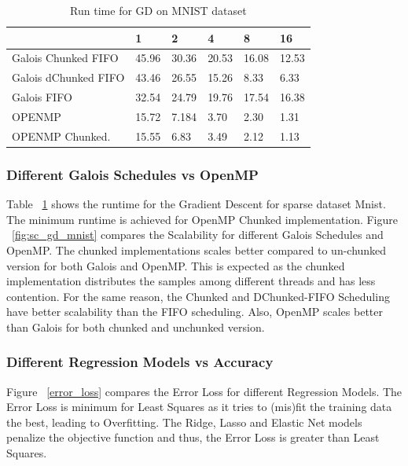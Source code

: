 \documentclass{sigplanconf}
\begin{document}
{\begin{table}[htbp]
\caption{Run time for GD on MNIST dataset}
\begin{tabular}{|p{9em}|p{2em}|p{2em}|p{2em}|p{2em}|p{2em}|}
\hline
 & 1 & 2 & 4 & 8 & 16 \\ \hline
Galois Chunked FIFO & 45.96 & 30.36 & 20.53 & 16.08 & 12.53 \\ \hline
Galois dChunked FIFO & 43.46 & 26.55 & 15.26 & 8.33 & 6.33 \\ \hline
Galois FIFO & 32.54 & 24.79 & 19.76 & 17.54 & 16.38 \\ \hline
OPENMP & 15.72 & 7.184 & 3.70 & 2.30 & 1.31 \\ \hline
OPENMP Chunked. & 15.55 & 6.83 & 3.49 & 2.12 & 1.13 \\ \hline
\end{tabular}
\label{tb:gd_mnist}
\end{table}
	
	\subsubsection{Different Galois Schedules vs OpenMP}

	Table ~\ref{tb:gd_mnist} shows the runtime for the Gradient Descent for sparse dataset Mnist. The minimum runtime is 
	achieved for OpenMP Chunked implementation. Figure ~\ref{fig:sc_gd_mnist} compares the Scalability for different Galois Schedules and OpenMP.
	The chunked implementations scales better compared to un-chunked version for both Galois and OpenMP. This is expected as the chunked
    	implementation distributes the samples among different threads and has less contention. For the same reason,
    	the Chunked and DChunked-FIFO Scheduling have better scalability than the FIFO scheduling. Also, OpenMP
    	scales better than Galois for both chunked and unchunked version.
     
    	\subsubsection{Different Regression Models vs Accuracy}

	Figure ~\ref{error_loss} compares the Error Loss for different Regression Models. The Error Loss is minimum for Least Squares
	as it tries to (mis)fit the training data the best, leading to Overfitting. The Ridge, Lasso and Elastic Net
	models penalize the objective function and thus, the Error Loss is greater than Least Squares. 
    
}
\end{document}
